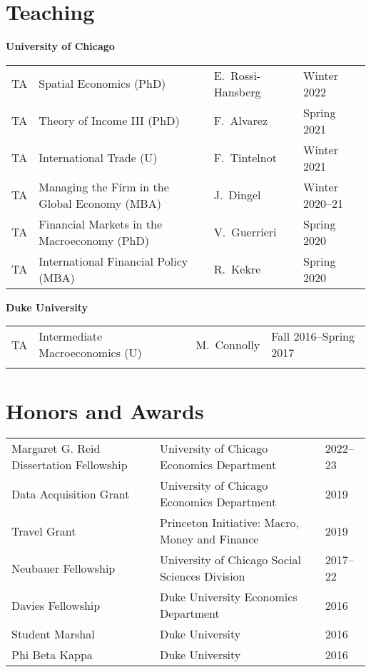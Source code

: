 \documentclass[margin,line]{res}
\begin{document}
\begin{resume}

\newpage
\section{\sc Teaching}
\textbf{University of Chicago}
\vspace*{-2mm}

\begin{tabular}{llll}
    TA & Spatial Economics (PhD) & E.~Rossi-Hansberg & Winter 2022 \\
    TA & Theory of Income III (PhD) & F.~Alvarez & Spring 2021 \\
    TA & International Trade (U) & F.~Tintelnot & Winter 2021 \\
    TA & Managing the Firm in the Global Economy (MBA) & J.~Dingel & Winter 2020--21 \\
    TA & Financial Markets in the Macroeconomy (PhD) & V.~Guerrieri & Spring 2020 \\
    TA & International Financial Policy (MBA) & R.~Kekre & Spring 2020
\end{tabular}

\textbf{Duke University}
\vspace*{-2mm}

\begin{tabular}{llll}
    TA & Intermediate Macroeconomics (U) & M.~Connolly & Fall 2016--Spring 2017 \\
    \phantom{TA} & \phantom{Managing the Firm in the Global Economy (MBA)} & \phantom{E.~Rossi-Hansberg} & \phantom{Winter 2020--21}
\end{tabular}

\vspace{-3mm}


\section{\sc Honors and Awards}

\begin{tabular}{@{}lll}
    Margaret G. Reid Dissertation Fellowship & University of Chicago Economics Department & 2022--23 \\
    Data Acquisition Grant & University of Chicago Economics Department & 2019 \\
    Travel Grant & Princeton Initiative: Macro, Money and Finance & 2019 \\
    Neubauer Fellowship & University of Chicago Social Sciences Division & 2017--22 \\
    Davies Fellowship & Duke University Economics Department & 2016 \\
    Student Marshal & Duke University & 2016 \\
    Phi Beta Kappa & Duke University & 2016 \\
\end{tabular}


\end{resume}
\end{document}
